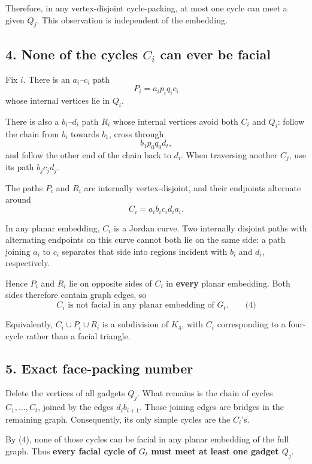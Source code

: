 \documentclass[
  11pt,
  a4paper,
]{article}
\newcounter{none} %
\begin{document}
Therefore, in any vertex-disjoint cycle-packing, at most one cycle can
meet a given \(Q_j\). This observation is independent of the embedding.

\subsection{\texorpdfstring{4. None of the cycles \(C_i\) can ever be
facial}{4. None of the cycles C\_i can ever be facial}}\label{none-of-the-cycles-c_i-can-ever-be-facial}

Fix \(i\). There is an \(a_i\)--\(c_i\) path \[
P_i=a_ip_iq_ic_i
\] whose internal vertices lie in \(Q_i\).

There is also a \(b_i\)--\(d_i\) path \(R_i\) whose internal vertices
avoid both \(C_i\) and \(Q_i\): follow the chain from \(b_i\) towards
\(b_1\), cross through \[
b_1p_0q_0d_t,
\] and follow the other end of the chain back to \(d_i\). When
traversing another \(C_j\), use its path \(b_jc_jd_j\).

The paths \(P_i\) and \(R_i\) are internally vertex-disjoint, and their
endpoints alternate around \[
C_i=a_i b_i c_i d_i a_i.
\]

In any planar embedding, \(C_i\) is a Jordan curve. Two internally
disjoint paths with alternating endpoints on this curve cannot both lie
on the same side: a path joining \(a_i\) to \(c_i\) separates that side
into regions incident with \(b_i\) and \(d_i\), respectively.

Hence \(P_i\) and \(R_i\) lie on opposite sides of \(C_i\) in
\textbf{every} planar embedding. Both sides therefore contain graph
edges, so \[
\boxed{C_i\text{ is not facial in any planar embedding of }G_t.} \qquad\text{(4)}
\]

Equivalently, \(C_i\cup P_i\cup R_i\) is a subdivision of \(K_4\), with
\(C_i\) corresponding to a four-cycle rather than a facial triangle.

\subsection{5. Exact face-packing
number}\label{exact-face-packing-number}

Delete the vertices of all gadgets \(Q_j\). What remains is the chain of
cycles \(C_1,\ldots,C_t\), joined by the edges \(d_i b_{i+1}\). Those
joining edges are bridges in the remaining graph. Consequently, its only
simple cycles are the \(C_i\)'s.

By (4), none of those cycles can be facial in any planar embedding of
the full graph. Thus \textbf{every facial cycle of \(G_t\) must meet at
least one gadget \(Q_j\)}.
\end{document}
